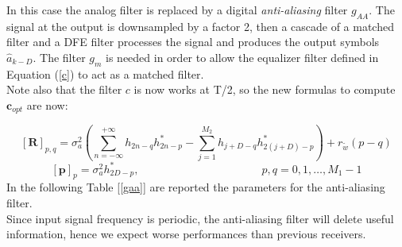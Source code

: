 \documentclass[a4paper, 12pt]{report}
\begin{document}
In this case the analog filter is replaced by a digital \textit{anti-aliasing} filter $g_{AA}$. The signal at the output is downsampled by a factor 2, then a cascade of a matched filter and a DFE  filter processes the signal and produces the output symbols $\hat{a}_{k-D}$. The filter $g_m$ is needed in order to allow the equalizer filter defined in Equation (\ref{c}) to act as a matched filter.\\
Note also that the filter $c$ is now works at T/2, so the new formulas to compute $\mathbf{c}_{opt}$ are now:

\begin{equation}
\mathbf{[R]}_{p,q} = \sigma_a^2 \left( \sum_{n=-\infty}^{+\infty}h_{2n-q}h^*_{2n-p}-\sum_{j=1}^{M_2}h_{j+D-q}h^*_{2(j+D)-p} \right) + r_{\tilde{w}}(p-q)
\end{equation}
\begin{equation}
\mathbf{[p]}_p = \sigma_a^2 h^*_{2D-p}, \quad\quad\quad\quad\quad\quad\quad\quad\quad\quad\quad p,q = 0,1,\dots,M_1-1
\end{equation}
In the following Table [\ref{gaa}] are reported the parameters for the anti-aliasing filter.\\
Since input signal frequency is periodic, the anti-aliasing filter will delete useful information, hence we expect worse performances than previous receivers.
\end{document}
